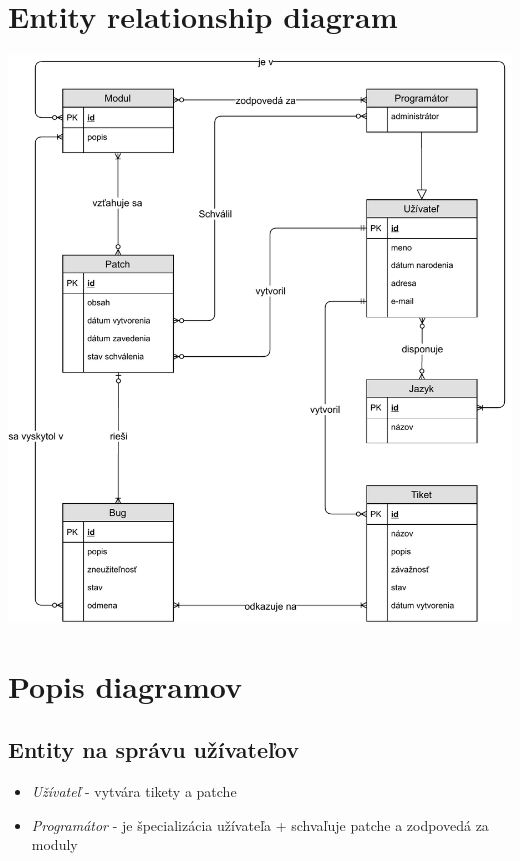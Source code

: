\documentclass[11pt, a4paper]{article}
\begin{document}
	\section{Entity relationship diagram}
	\begin{center}
		\vspace*{\fill}
		\includegraphics[width=0.95\linewidth]{ER_diagram.pdf}
		\vspace*{\fill}
	\end{center}

	\newpage
	\section{Popis diagramov}
	\subsection{Entity na správu užívateľov}

	\begin{itemize}
	\item \emph{Užívateľ} - vytvára tikety a patche
	\item \emph{Programátor} - je špecializácia užívateľa + schvaľuje patche a zodpovedá za moduly
	\end{itemize}
\end{document}
